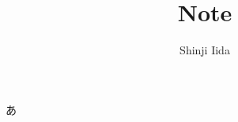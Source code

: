 \documentclass[11pt, oneside]{jsarticle}   	%
\title{Note}
\author{Shinji Iida}
\begin{document}
\maketitle
あ
\end{document}
